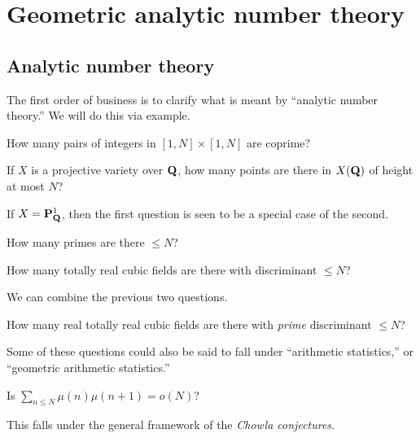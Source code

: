 
\section{Geometric analytic number theory}





\subsection{Analytic number theory}

The first order of business is to clarify what is meant by ``analytic number 
theory.'' We will do this via example. 

\begin{question}
How many pairs of integers in $[1,N]\times [1,N]$ are coprime? 
\end{question}

\begin{question}
If $X$ is a projective variety over $\mathbf{Q}$, how many points are there in 
$X(\mathbf{Q})$ of height at most $N$? 
\end{question}

If $X=\mathbf{P}_{\mathbf{Q}}^1$, then the first question is seen to be a special case of the 
second. 

\begin{question}
How many primes are there $\leq N$?
\end{question}

\begin{question}
How many totally real cubic fields are there with discriminant $\leq N$?
\end{question}

We can combine the previous two questions. 

\begin{question}
How many real totally real cubic fields are there with \emph{prime} discriminant 
$\leq N$?
\end{question}

Some of these questions could also be said to fall under ``arithmetic 
statistics,'' or ``geometric arithmetic statistics.'' 

\begin{question}
Is $\sum_{n\leq N} \mu(n) \mu(n+1) = o(N)$?
\end{question}

This falls under the general framework of the \emph{Chowla conjectures}. 

